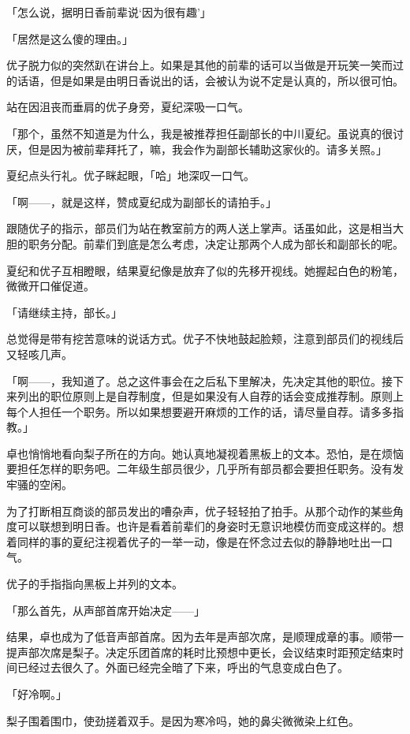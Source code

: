 \documentclass[UTF8]{ctexart}
\begin{document}
    「怎么说，据明日香前辈说‘因为很有趣’」

    「居然是这么傻的理由。」

    优子脱力似的突然趴在讲台上。如果是其他的前辈的话可以当做是开玩笑一笑而过的话语，但是如果是由明日香说出的话，会被认为说不定是认真的，所以很可怕。

    站在因沮丧而垂肩的优子身旁，夏纪深吸一口气。

    「那个，虽然不知道是为什么，我是被推荐担任副部长的中川夏纪。虽说真的很讨厌，但是因为被前辈拜托了，嘛，我会作为副部长辅助这家伙的。请多关照。」

    夏纪点头行礼。优子眯起眼，「哈」地深叹一口气。

    「啊——，就是这样，赞成夏纪成为副部长的请拍手。」

    跟随优子的指示，部员们为站在教室前方的两人送上掌声。话虽如此，这是相当大胆的职务分配。前辈们到底是怎么考虑，决定让那两个人成为部长和副部长的呢。

    夏纪和优子互相瞪眼，结果夏纪像是放弃了似的先移开视线。她握起白色的粉笔，微微开口催促道。

    「请继续主持，部长。」

    总觉得是带有挖苦意味的说话方式。优子不快地鼓起脸颊，注意到部员们的视线后又轻咳几声。

    「啊——，我知道了。总之这件事会在之后私下里解决，先决定其他的职位。接下来列出的职位原则上是自荐制度，但是如果没有人自荐的话会变成推荐制。原则上每个人担任一个职务。所以如果想要避开麻烦的工作的话，请尽量自荐。请多多指教。」

    卓也悄悄地看向梨子所在的方向。她认真地凝视着黑板上的文本。恐怕，是在烦恼要担任怎样的职务吧。二年级生部员很少，几乎所有部员都会要担任职务。没有发牢骚的空闲。

    为了打断相互商谈的部员发出的嘈杂声，优子轻轻拍了拍手。从那个动作的某些角度可以联想到明日香。也许是看着前辈们的身姿时无意识地模仿而变成这样的。想着同样的事的夏纪注视着优子的一举一动，像是在怀念过去似的静静地吐出一口气。

    优子的手指指向黑板上并列的文本。

    「那么首先，从声部首席开始决定——」

    结果，卓也成为了低音声部首席。因为去年是声部次席，是顺理成章的事。顺带一提声部次席是梨子。决定乐团首席的耗时比预想中更长，会议结束时距预定结束时间已经过去很久了。外面已经完全暗了下来，呼出的气息变成白色了。

    「好冷啊。」

    梨子围着围巾，使劲搓着双手。是因为寒冷吗，她的鼻尖微微染上红色。
\end{document}
